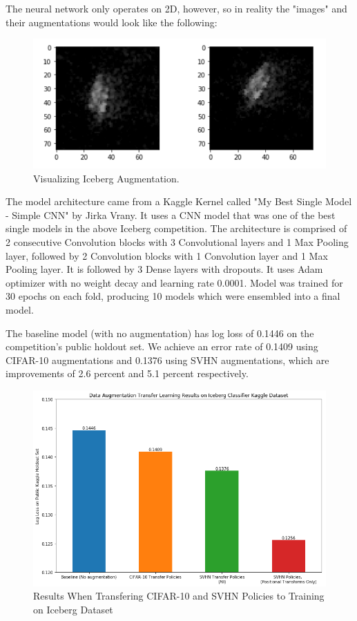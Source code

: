 \documentclass[10pt,twocolumn,letterpaper]{article}
\begin{document}
The neural network only operates on 2D, however, so in reality the "images" and their augmentations would look like the following:

\begin{figure}[bhp]
\includegraphics[width=\columnwidth]{iceberg_aug_2D_example.png}
\caption{Visualizing Iceberg Augmentation.}
\end{figure}

The model architecture came from a Kaggle Kernel called "My Best Single Model - Simple CNN" by Jirka Vrany.  It uses a CNN model that was one of the best single models in the above Iceberg competition. The architecture is comprised of 2 consecutive Convolution blocks with 3 Convolutional layers and 1 Max Pooling layer, followed by 2 Convolution blocks with 1 Convolution layer and 1 Max Pooling layer. It is followed by 3 Dense layers with dropouts. It uses Adam optimizer with no weight decay and learning rate 0.0001. Model was trained for 30 epochs on each fold, producing 10 models which were ensembled into a final model.  

The baseline model (with no augmentation) has log loss of 0.1446 on the competition's public holdout set. We achieve an error rate of 0.1409 using CIFAR-10 augmentations and 0.1376 using SVHN augmentations, which are improvements of 2.6 percent and 5.1 percent respectively.

\begin{figure}[bhp]
\includegraphics[width=\columnwidth]{iceberg_results.png}
\caption{Results When Transfering CIFAR-10 and SVHN Policies to Training on Iceberg Dataset}
\end{figure}
\end{document}
